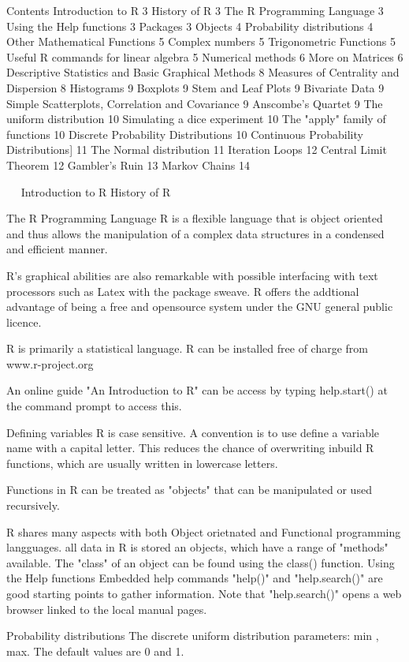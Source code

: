 Contents
Introduction to R	3
History of R	3
The R Programming Language	3
Using the Help functions	3
Packages	3
Objects	4
Probability distributions	4
Other Mathematical Functions	5
Complex numbers	5
Trigonometric  Functions	5
Useful R commands for linear algebra	5
Numerical methods	6
More on Matrices	6
Descriptive Statistics and Basic Graphical Methods	8
Measures of Centrality and Dispersion	8
Histograms	9
Boxplots	9
Stem and Leaf Plots	9
Bivariate Data	9
Simple Scatterplots, Correlation and Covariance	9
Anscombe’s Quartet	9
The uniform distribution	10
Simulating a dice experiment	10
The "apply" family of functions	10
Discrete Probability Distributions	10
Continuous Probability Distributions]	11
The Normal distribution	11
Iteration Loops	12
Central Limit Theorem	12
Gambler’s Ruin	13
Markov Chains	14

 
Introduction to R
History of R

The R Programming Language
R is a flexible language that is object oriented and thus allows the manipulation of a complex
data structures in a condensed and efficient manner.
 
R's graphical abilities are also remarkable with possible interfacing with text processors such as
Latex with the package sweave.
R offers the addtional advantage of being a free and opensource system under the GNU general
public licence.

R is primarily a statistical language.
R can be installed free of charge from www.r-project.org

An online guide "An Introduction to R" can be access by typing
help.start() at the command prompt to access this.

Defining variables
R is case sensitive.
A convention is to use define a variable name with a capital letter.
This reduces the chance of overwriting inbuild R functions, which are usually written in lowercase letters.


Functions in R can be treated as "objects" that can be manipulated or used recursively.

R shares many aspects with both Object orietnated and Functional programming langguages.
all data in R is stored an objects, which have a range of "methods" available.
The "class" of an object can be found using the class() function.
Using the Help functions
Embedded help commands "help()" and "help.search()" are good starting points to gather information. 
Note that "help.search()" opens a web browser linked to the local manual pages.
 
 
Probability distributions
The discrete uniform distribution
parameters: min , max.
The default values are 0 and 1.
 

